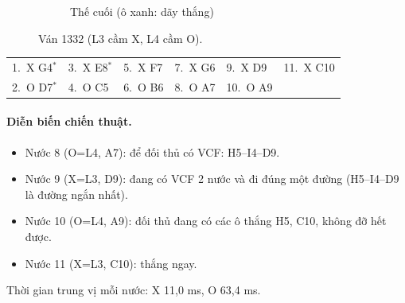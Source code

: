 \begin{figure}[H]
\begin{subfigure}[t]{.48\linewidth}
    \caption{Thế cuối (ô xanh: dãy thắng)}
  \end{subfigure}
  \caption{Ván 1332 (L3 cầm X, L4 cầm O).}
  \label{fig:cs-van-14}
\end{figure}
{\footnotesize\linespread{1}\selectfont
\noindent\begin{tabularx}{\linewidth}{*{6}{X}}
\toprule
1.~X G4$^\ast$ & 3.~X E8$^\ast$ & 5.~X F7 & 7.~X G6 & 9.~X D9 & 11.~X C10 \\
2.~O D7$^\ast$ & 4.~O C5 & 6.~O B6 & 8.~O A7 & 10.~O A9 &  \\
\bottomrule
\end{tabularx}\par}
\paragraph{Diễn biến chiến thuật.}
\begin{itemize}\small
\setlength{\itemsep}{0pt}
  \item Nước 8 (O=L4, A7): để đối thủ có VCF: H5--I4--D9.
  \item Nước 9 (X=L3, D9): đang có VCF 2 nước và đi đúng một đường (H5--I4--D9 là đường ngắn nhất).
  \item Nước 10 (O=L4, A9): đối thủ đang có các ô thắng H5, C10, không đỡ hết được.
  \item Nước 11 (X=L3, C10): thắng ngay.
\end{itemize}
Thời gian trung vị mỗi nước: X 11,0 ms, O 63,4 ms.
\clearpage

